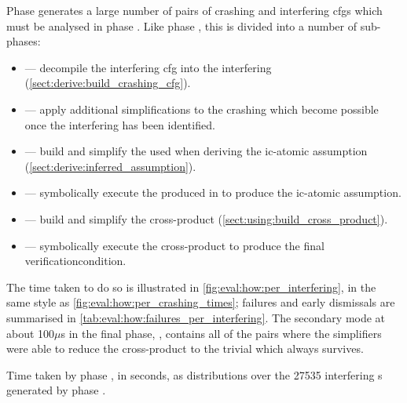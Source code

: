 Phase \subcrash{} generates a large number of pairs of crashing
{\StateMachines} and interfering \glspl{cfg} which must be analysed in
phase \subinterfering{}.  Like phase \subcrash{}, this is divided into
a number of sub-phases:
\begin{itemize}
\item {} --- decompile the interfering \gls{cfg} into the
  interfering {\StateMachine} (\autoref{sect:derive:build_crashing_cfg}).
\item {} --- apply additional simplifications to the
  crashing {\StateMachine} which become possible once the interfering
  {\StateMachine} has been identified.
\item {} --- build and simplify the {\StateMachine}
  used when deriving the \gls{ic-atomic} assumption
  (\autoref{sect:derive:inferred_assumption}).
\item {} --- symbolically execute the {\StateMachine}
  produced in  to produce the \gls{ic-atomic}
  assumption.
\item {} --- build and simplify the cross-product
  {\StateMachine} (\autoref{sect:using:build_cross_product}).
\item {} --- symbolically execute the cross-product
  {\StateMachine} to produce the final \gls{verificationcondition}.
\end{itemize}
The time taken to do so is illustrated in
\autoref{fig:eval:how:per_interfering}, in the same style as
\autoref{fig:eval:how:per_crashing_times}; failures and early
dismissals are summarised in
\autoref{tab:eval:how:failures_per_interfering}.  The secondary mode
at about 100$\mu$s in the final phase, , contains
all of the {\StateMachine} pairs where the {\StateMachine} simplifiers
were able to reduce the cross-product {\StateMachine} to the trivial
{\StateMachine} which always survives.

\begin{sanefig}
  \caption{Time taken by phase \subinterfering{}, in seconds, as
    distributions over the 27535 interfering s
    generated by phase \subcrash{}.}
  \label{fig:eval:how:per_interfering}
\end{sanefig}

